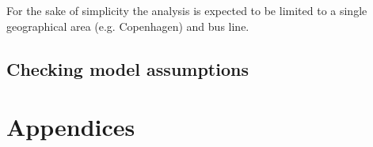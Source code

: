 \documentclass[a4paper,11pt]{article}
\begin{document}
For the sake of simplicity the analysis is expected to be limited to a single geographical area (e.g. Copenhagen) and bus line.

\subsection{Checking model assumptions}

\begin{spacing}{1}
  
  
\end{spacing}

\appendix
\section*{Appendices}
\renewcommand{\thesubsection}{\Alph{subsection}}



\end{document}
